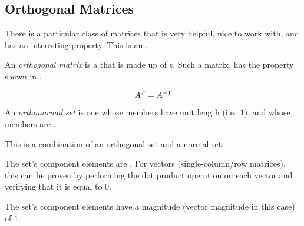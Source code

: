 \subsection{Orthogonal Matrices}\label{subsec:Orthogonal_Matrices}
There is a particular class of matrices that is very helpful, nice to work with, and has an interesting property.
This is an .

\begin{definition}\label{def:Orthogonal_Matrix}
  An \emph{orthogonal matrix} is a  that is made up of s.
  Such a matrix, has the property shown in .

  \begin{equation}\label{eq:Orthogonal_Matrix_Property}
    {A}^{T} = A^{-1}
  \end{equation}
\end{definition}

\begin{definition}\label{def:Orthonormal_Set}
  An \emph{orthonormal set} is one whose members have unit length (i.e.\ $1$), and whose members are .

  \begin{remark}
    This is a combination of an orthogonal set and a normal set.
    \begin{description}[noitemsep]
    \item[Orthogonal] The set's component elements are .
      For vectors (single-column/row matrices), this can be proven by performing the dot product operation on each vector and verifying that it is equal to 0.
    \item[Normal] The set's component elements have a magnitude (vector magnitude in this case) of $1$.
    \end{description}
  \end{remark}
\end{definition}


